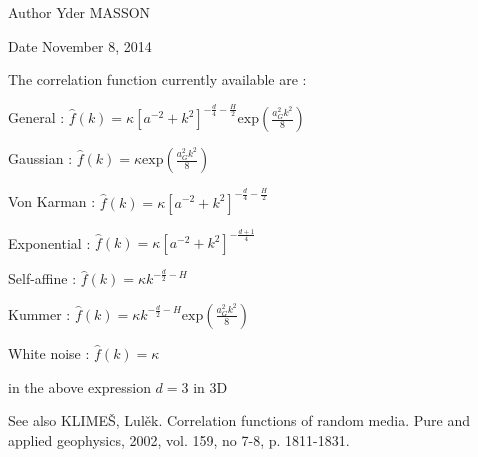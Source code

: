 \begin{DoxyAuthor}{\-Author}
\-Yder \-M\-A\-S\-S\-O\-N 
\end{DoxyAuthor}
\begin{DoxyDate}{\-Date}
\-November 8, 2014
\end{DoxyDate}
\-The correlation function currently available are \-: \par
 \par
 \par
 \-General \-: $ \hat{f}(k) = \kappa \left[ a^{-2}+k^2\right]^{-\frac{d}{4}-\frac{H}{2}} \mbox{exp}\left(\frac{a_G^2k^2}{8}\right)$ \par
 \par
 \-Gaussian \-: $ \hat{f}(k) = \kappa \mbox{exp}\left(\frac{a_G^2k^2}{8}\right)$ \par
 \par
 \-Von \-Karman \-: $ \hat{f}(k) = \kappa \left[ a^{-2}+k^2\right]^{-\frac{d}{4}-\frac{H}{2}}$ \par
 \par
 \-Exponential \-: $ \hat{f}(k) = \kappa \left[ a^{-2}+k^2\right]^{-\frac{d+1}{4}}$ \par
 \par
 \-Self-\/affine \-: $ \hat{f}(k) = \kappa k^{-\frac{d}{2}-H}$ \par
 \par
 \-Kummer \-: $ \hat{f}(k) = \kappa k^{-\frac{d}{2}-H} \mbox{exp}\left(\frac{a_G^2k^2}{8}\right)$ \par
 \par
 \-White noise \-: $ \hat{f}(k) = \kappa $ \par
 \par
 in the above expression $ d = 3$ in 3\-D

\begin{DoxySeeAlso}{\-See also}
\-K\-L\-I\-M\-EŠ, \-Lulěk. \-Correlation functions of random media. \-Pure and applied geophysics, 2002, vol. 159, no 7-\/8, p. 1811-\/1831. 
\end{DoxySeeAlso}

